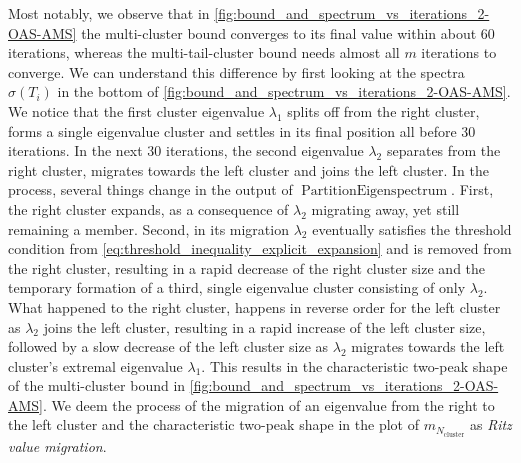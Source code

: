 Most notably, we observe that in \cref{fig:bound_and_spectrum_vs_iterations_2-OAS-AMS} the multi-cluster bound converges to its final value within about 60 iterations, whereas the multi-tail-cluster bound needs almost all $m$ iterations to converge. We can understand this difference by first looking at the spectra $\sigma(T_i)$ in the bottom of \cref{fig:bound_and_spectrum_vs_iterations_2-OAS-AMS}. We notice that the first cluster eigenvalue $\lambda_1$ splits off from the right cluster, forms a single eigenvalue cluster and settles in its final position all before 30 iterations. In the next 30 iterations, the second eigenvalue $\lambda_2$ separates from the right cluster, migrates towards the left cluster and joins the left cluster. In the process, several things change in the output of $\operatorname{PartitionEigenspectrum}$. First, the right cluster expands, as a consequence of $\lambda_2$ migrating away, yet still remaining a member. Second, in its migration $\lambda_2$ eventually satisfies the threshold condition from \cref{eq:threshold_inequality_explicit_expansion} and is removed from the right cluster, resulting in a rapid decrease of the right cluster size and the temporary formation of a third, single eigenvalue cluster consisting of only $\lambda_2$. What happened to the right cluster, happens in reverse order for the left cluster as $\lambda_2$ joins the left cluster, resulting in a rapid increase of the left cluster size, followed by a slow decrease of the left cluster size as $\lambda_2$ migrates towards the left cluster's extremal eigenvalue $\lambda_1$. This results in the characteristic two-peak shape of the multi-cluster bound in \cref{fig:bound_and_spectrum_vs_iterations_2-OAS-AMS}. We deem the process of the migration of an eigenvalue from the right to the left cluster and the characteristic two-peak shape in the plot of $m_{N_{\text{cluster}}}$ as \textit{Ritz value migration}. 

